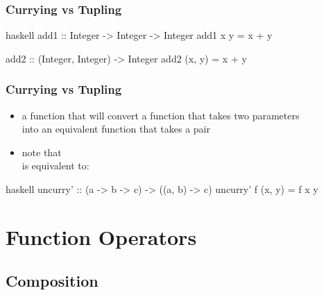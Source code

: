 \documentclass[dvipsnames]{beamer}
\theoremstyle{plain}
\begin{document}
\begin{frame}[fragile]
  \frametitle{Currying vs Tupling}

  \begin{exampleblock}{}
    \begin{pygments}{haskell}
add1 :: Integer -> Integer -> Integer
add1 x y = x + y

add2 :: (Integer, Integer) -> Integer
add2 (x, y) = x + y
    \end{pygments}
  \end{exampleblock}
\end{frame}

\begin{frame}[fragile]
  \frametitle{Currying vs Tupling}

  \begin{itemize}
    \item a function that will convert a function that takes two parameters\\
      into an equivalent function that takes a pair
  \end{itemize}

  \begin{exampleblock}{}
  \end{exampleblock}

  \pause
  \begin{itemize}
    \item note that \\
      is equivalent to: 
  \end{itemize}

  \begin{exampleblock}{}
    \begin{pygments}{haskell}
uncurry' :: (a -> b -> c) -> ((a, b) -> c)
uncurry' f (x, y) = f x y
    \end{pygments}
  \end{exampleblock}
\end{frame}

\section{Function Operators}

\subsection{Composition}
\end{document}

